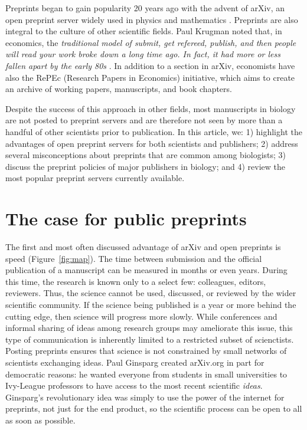 \documentclass[letterpaper,twocolumn,superscriptaddress,showkeys,longbibliography]{revtex4-1}
\begin{document}
Preprints began to gain popularity 20 years ago with the advent of arXiv, an open
preprint server widely used in physics and mathematics \cite{gin11}. Preprints
are also integral to the culture of other scientific fields.  Paul Krugman noted
that, in economics, the \emph{traditional model of submit, get refereed,
publish, and then people will read your work broke down a long time ago. In
fact, it had more or less fallen apart by the early 80s} \cite{kru12}. In
addition to a section in arXiv, economists have also the RePEc (Research Papers
in Economics) initiative, which aims to create an archive of working papers,
manuscripts, and book chapters.

Despite the success of this approach in other
fields, most manuscripts in biology are not posted to preprint servers and
are therefore not seen by more than a handful of other scientists prior to
publication. In this article, we: 1) highlight the
advantages of open preprint servers for both scientists and publishers; 2)
address several misconceptions about preprints that are common among biologists;
3) discuss the preprint policies of major publishers in biology;
and 4) review the most popular preprint servers currently available.

\section{The case for public preprints}

The first and most often discussed advantage of arXiv and open preprints is
speed (Figure~\ref{fig:map}). The time between submission and the official
publication of a manuscript can be measured in months or even years. During
this time, the research is known only to a select few: colleagues, editors,
reviewers.  Thus, the science cannot be used, discussed, or reviewed by the
wider scientific community.  If the science being published is a year
or more behind the cutting edge, then science will progress more slowly. While
conferences and informal sharing of ideas among research groups may ameliorate
this issue, this type of communication is inherently limited to a restricted
subset of scienctists. Posting preprints ensures that science is not
constrained by small networks of scientists exchanging ideas.  Paul Ginsparg
created arXiv.org in part for democratic reasons: he wanted everyone from students
in small universities to Ivy-League professors to have access to the most recent
scientific \emph{ideas}. Ginsparg's revolutionary idea was simply to use the power
of the internet for preprints, not just for the end product, so the scientific
process can be open to all as soon as possible.
\end{document}
